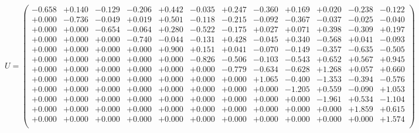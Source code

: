 \documentclass[9pt]{article}
\theoremstyle{plain}
\theoremstyle{definition}
\theoremstyle{remark}
\numberwithin{equation}{section}
\begin{document}
$U = \left(
\begin{array}{
cccccccccccc}
-0.658 & +0.140 & -0.129 & -0.206 & +0.442 & -0.035 & +0.247 & -0.360 & +0.169 & +0.020 & -0.238 & -0.122 \\
+0.000 & -0.736 & -0.049 & +0.019 & +0.501 & -0.118 & -0.215 & -0.092 & -0.367 & -0.037 & -0.025 & -0.040 \\
+0.000 & +0.000 & -0.654 & -0.064 & +0.280 & -0.522 & -0.175 & +0.027 & +0.071 & +0.398 & -0.309 & +0.197 \\
+0.000 & +0.000 & +0.000 & -0.740 & -0.044 & -0.131 & +0.428 & -0.045 & +0.340 & -0.568 & +0.041 & -0.093 \\
+0.000 & +0.000 & +0.000 & +0.000 & +0.900 & +0.151 & +0.041 & -0.070 & -0.149 & -0.357 & -0.635 & -0.505 \\
+0.000 & +0.000 & +0.000 & +0.000 & +0.000 & -0.826 & -0.506 & -0.103 & -0.543 & +0.652 & +0.567 & +0.945 \\
+0.000 & +0.000 & +0.000 & +0.000 & +0.000 & +0.000 & -0.779 & -0.634 & -0.628 & +1.268 & +0.057 & +0.660 \\
+0.000 & +0.000 & +0.000 & +0.000 & +0.000 & +0.000 & +0.000 & +1.065 & -0.400 & -1.353 & -0.394 & -0.576 \\
+0.000 & +0.000 & +0.000 & +0.000 & +0.000 & +0.000 & +0.000 & +0.000 & -1.205 & +0.559 & -0.090 & +1.053 \\
+0.000 & +0.000 & +0.000 & +0.000 & +0.000 & +0.000 & +0.000 & +0.000 & +0.000 & -1.961 & +0.534 & -1.104 \\
+0.000 & +0.000 & +0.000 & +0.000 & +0.000 & +0.000 & +0.000 & +0.000 & +0.000 & +0.000 & +1.859 & +0.615 \\
+0.000 & +0.000 & +0.000 & +0.000 & +0.000 & +0.000 & +0.000 & +0.000 & +0.000 & +0.000 & +0.000 & +1.574 \\
\end{array}
\right)$ \newline 
\end{document}
